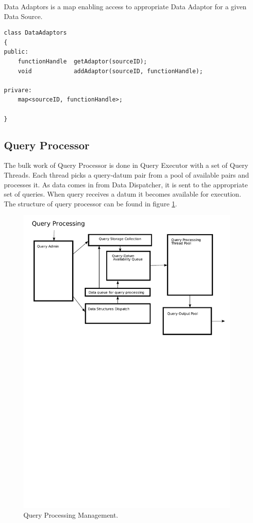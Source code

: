 \documentclass[14pt]{article}
\begin{document}
\noindent Data Adaptors is a map enabling access to appropriate Data Adaptor for a given Data Source.

\begin{verbatim}
class DataAdaptors
{
public:
    functionHandle  getAdaptor(sourceID);
    void            addAdaptor(sourceID, functionHandle);

privare:
    map<sourceID, functionHandle>;
	
}
\end{verbatim}

\subsection{Query Processor}

The bulk work of Query Processor is done in Query Executor with a set of Query Threads. Each thread picks a query-datum pair from a pool of available pairs and processes it. As data comes in from Data Dispatcher, it is sent to the appropriate set of queries. When query receives a datum it becomes available for execution. The structure of query processor can be found in figure \ref{QueryProcessingPic}.

\begin{figure}
  \includegraphics[width=5.00in]{../figures/QueryProcessing.pdf}
  \caption{Query Processing Management.}
  \label{QueryProcessingPic}
\end{figure}
\end{document}
